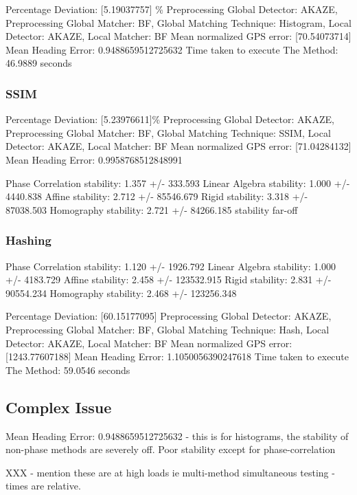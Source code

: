 Percentage Deviation: [5.19037757] \%
Preprocessing Global Detector: AKAZE, Preprocessing Global Matcher: BF, Global Matching Technique: Histogram, Local Detector: AKAZE, Local Matcher: BF
Mean normalized GPS error: [70.54073714]
 Mean Heading Error: 0.9488659512725632
Time taken to execute The Method: 46.9889 seconds

\subsubsection*{SSIM}
Percentage Deviation: [5.23976611]\%
Preprocessing Global Detector: AKAZE, Preprocessing Global Matcher: BF, Global Matching Technique: SSIM, Local Detector: AKAZE, Local Matcher: BF
Mean normalized GPS error: [71.04284132]
 Mean Heading Error: 0.9958768512848991

 Phase Correlation stability: 1.357 +/- 333.593
Linear Algebra stability: 1.000 +/- 4440.838
Affine stability: 2.712 +/- 85546.679
Rigid stability: 3.318 +/- 87038.503
Homography stability: 2.721 +/- 84266.185
stability far-off

\subsubsection*{Hashing}
Phase Correlation stability: 1.120 +/- 1926.792
Linear Algebra stability: 1.000 +/- 4183.729
Affine stability: 2.458 +/- 123532.915
Rigid stability: 2.831 +/- 90554.234
Homography stability: 2.468 +/- 123256.348

Percentage Deviation: [60.15177095] %
Preprocessing Global Detector: AKAZE, Preprocessing Global Matcher: BF, Global Matching Technique: Hash, Local Detector: AKAZE, Local Matcher: BF
Mean normalized GPS error: [1243.77607188]
 Mean Heading Error: 1.1050056390247618
Time taken to execute The Method: 59.0546 seconds


\subsection*{Complex Issue}
Mean Heading Error: 0.9488659512725632 - this is for histograms, the stability of non-phase methods are severely off. Poor stability except for phase-correlation



XXX - mention these are at high loads ie multi-method simultaneous testing - times are relative. 